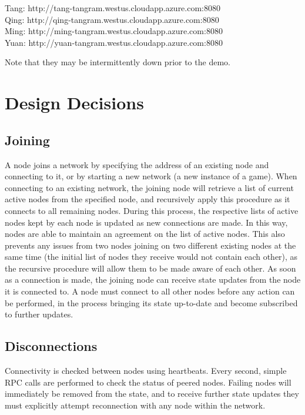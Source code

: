 \documentclass[twocolumn]{article}
\begin{document}
\begin{flushleft}
Tang: http://tang-tangram.westus.cloudapp.azure.com:8080\\
Qing: http://qing-tangram.westus.cloudapp.azure.com:8080\\
Ming: http://ming-tangram.westus.cloudapp.azure.com:8080\\
Yuan: http://yuan-tangram.westus.cloudapp.azure.com:8080\\

\end{flushleft}
Note that they may be intermittently down prior to the demo.

\section{Design Decisions}
\subsection{Joining}
A node joins a network by specifying the address of an existing node and connecting to it, or by starting a new network (a new instance of a game). When connecting to an existing network, the joining node will retrieve a list of current active nodes from the specified node, and recursively apply this procedure as it connects to all remaining nodes. During this process, the respective lists of active nodes kept by each node is updated as new connections are made. In this way, nodes are able to maintain an agreement on the list of active nodes. This also prevents any issues from two nodes joining on two different existing nodes at the same time (the initial list of nodes they receive would not contain each other), as the recursive procedure will allow them to be made aware of each other. As soon as a connection is made, the joining node can receive state updates from the node it is connected to. A node must connect to all other nodes before any action can be performed, in the process bringing its state up-to-date and become subscribed to further updates.

\subsection{Disconnections}
Connectivity is checked between nodes using heartbeats. Every second, simple RPC calls are performed to check the status of peered nodes. Failing nodes will immediately be removed from the state, and to receive further state updates they must explicitly attempt reconnection with any node within the network.
\end{document}
